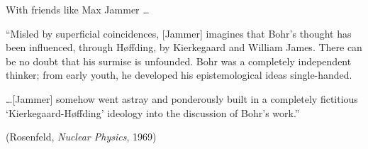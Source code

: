 \begin{frame}{With friends like Max Jammer \dots }

``Misled by superficial coincidences, [Jammer] imagines that Bohr's
  thought has been influenced, through Høffding, by Kierkegaard and
  William James. There can be no doubt that his surmise is
  unfounded. Bohr was a completely independent thinker; from early
  youth, he developed his epistemological ideas single-handed.

  \bigskip \dots [Jammer] somehow went astray and ponderously built in
  a completely fictitious `Kierkegaard-Høffding' ideology into the
  discussion of Bohr's work.''

  \medskip (Rosenfeld, \emph{Nuclear Physics}, 1969)

\end{frame}




